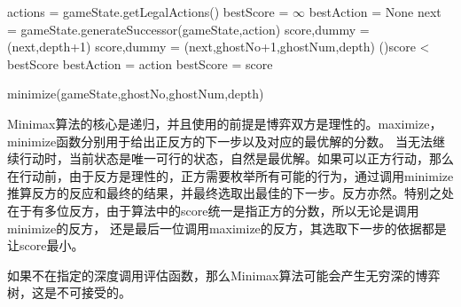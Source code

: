 \begin{procedure}[h]
    \;
    actions = gameState.getLegalActions()\;
    {}
    bestScore = $\infty$\;
    bestAction = None\;
    {
        next = gameState.generateSuccessor(gameState,action)\;
        {
            score,dummy = \maximize(next,depth+1)
        }
        {
        score,dummy = \minimize(next,ghostNo+1,ghostNum,depth)
        }
        \If(){score < bestScore}
        {
            bestAction = action\;
            bestScore = score\;
        }
    }
    \caption{minimize(gameState,ghostNo,ghostNum,depth)}
\end{procedure}

Minimax算法的核心是递归，并且使用的前提是博弈双方是理性的。maximize，minimize函数分别用于给出正反方的下一步以及对应的最优解的分数。
当无法继续行动时，当前状态是唯一可行的状态，自然是最优解。如果可以正方行动，那么在行动前，由于反方是理性的，正方需要枚举所有可能的行为，通过调用minimize
推算反方的反应和最终的结果，并最终选取出最佳的下一步。反方亦然。特别之处在于有多位反方，由于算法中的score统一是指正方的分数，所以无论是调用minimize的反方，
还是最后一位调用maximize的反方，其选取下一步的依据都是让score最小。

如果不在指定的深度调用评估函数，那么Minimax算法可能会产生无穷深的博弈树，这是不可接受的。
